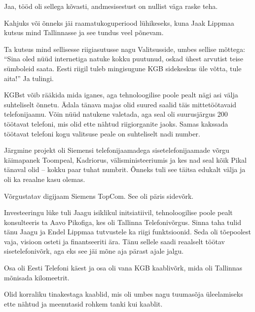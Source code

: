 Jaa, tööd oli sellega kõvasti, andmesisestust on nullist väga raske teha.

Kahjuks või õnneks jäi raamatukoguperiood 
lühikeseks, kuna Jaak Lippmaa kutsus mind 
Tallinnasse ja see tundus veel põnevam. 

Ta kutsus mind sellisesse riigiasutusse nagu Valitsusside, 
umbes sellise mõttega: \enquote{Sina oled nüüd internetiga natuke 
kokku puutunud, oskad ühest arvutist teise sümboleid saata. Eesti riigil tuleb mingisugune 
KGB sidekeskus üle võtta, tule aita!} Ja tulingi.

KGBst võib rääkida mida iganes, aga tehnoloogilise poole 
pealt nägi asi välja suhteliselt õnnetu. Ädala tänava 
majas olid suured saalid täis mittetöötavaid 
telefonijaamu. Võin nüüd natukene valetada, aga seal oli suurusjärgus 200 
töötavat telefoni, mis olid ette nähtud riigiorganite jaoks. Samas kakssada töötavat telefoni kogu valitsuse peale 
on suhteliselt nadi number.

Järgmine projekt oli Siemensi telefonijaamadega sisetelefonijaamade 
võrgu käimapanek Toompeal, Kadriorus, välisministeeriumis ja kes nad seal 
kõik Pikal tänaval olid -- kokku paar tuhat numbrit. Õnneks tuli see täitsa 
edukalt välja ja oli ka reaalne kasu olemas.


Võrgustatav digijaam Siemens TopCom. See oli päris sidevõrk.


Investeeringu lüke tuli Jaagu isiklikul initsiatiivil, 
tehnoloogilise poole pealt konsulteeris ta Aavo Pikofiga, 
kes oli Tallinna Telefonivõrgus. Sinna taha tulid tänu Jaagu ja Endel 
Lippmaa tutvustele ka riigi funktsioonid. Seda oli 
tõepoolest vaja, visioon osteti ja finantseeriti ära. Tänu sellele saadi reaalselt 
töötav sisetelefonivõrk, aga eks see jäi mõne aja pärast ajale jalgu.


Osa oli Eesti Telefoni käest ja osa oli vana KGB kaablivõrk, mida oli 
Tallinnas mõnisada kilomeetrit.


Olid korraliku tinakestaga kaablid, mis oli umbes nagu tuumasõja üleelamiseks 
ette nähtud ja meenutasid rohkem tanki kui kaablit.

